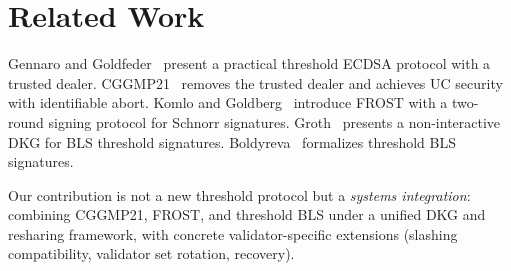 \section{Related Work}

\label{sec:related}

Gennaro and Goldfeder~\cite{gennaro2020fast} present a practical threshold ECDSA
protocol with a trusted dealer. CGGMP21~\cite{canetti2021uc} removes the trusted
dealer and achieves UC security with identifiable abort. Komlo and
Goldberg~\cite{komlo2020frost} introduce FROST with a two-round signing protocol
for Schnorr signatures. Groth~\cite{groth2021non} presents a non-interactive DKG
for BLS threshold signatures. Boldyreva~\cite{boldyreva2003threshold} formalizes
threshold BLS signatures.

Our contribution is not a new threshold protocol but a \emph{systems integration}:
combining CGGMP21, FROST, and threshold BLS under a unified DKG and resharing
framework, with concrete validator-specific extensions (slashing compatibility,
validator set rotation, recovery).

